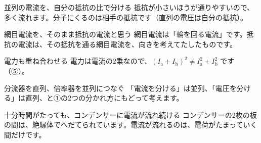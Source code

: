 \begin{tsumazuki}{並列の電流を、自分の抵抗の比で分ける}
抵抗が小さいほうが通りやすいので、多く流れます。分子にくるのは相手の抵抗です（直列の電圧は自分の抵抗）。
\end{tsumazuki}

\begin{tsumazuki}{網目電流を、そのまま抵抗の電流と思う}
網目電流は「輪を回る電流」です。抵抗の電流は、その抵抗を通る網目電流を、向きを考えてたしたものです。
\end{tsumazuki}

\begin{tsumazuki}{電力も重ね合わせる}
電力は電流の2乗なので、$(I_{\mathrm a}+I_{\mathrm b})^2\neq I_{\mathrm a}^2+I_{\mathrm b}^2$ です（⑤）。
\end{tsumazuki}

\begin{tsumazuki}{分流器を直列、倍率器を並列につなぐ}
「電流を分ける」は並列、「電圧を分ける」は直列、と①の2つの分かれ方にもどって考えます。
\end{tsumazuki}

\begin{tsumazuki}{十分時間がたっても、コンデンサーに電流が流れ続ける}
コンデンサーの2枚の板の間は、絶縁体でへだてられています。電流が流れるのは、電荷がたまっていく間だけです。
\end{tsumazuki}


